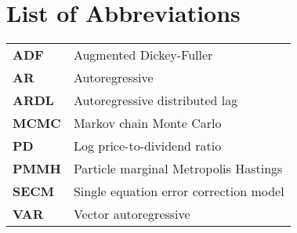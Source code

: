 \chapter{List of Abbreviations}
\begin{tabular}{ll}
\textbf{ADF} & Augmented Dickey-Fuller \\
\textbf{AR} & Autoregressive \\
\textbf{ARDL} & Autoregressive distributed lag \\
\textbf{MCMC} & Markov chain Monte Carlo \\
\textbf{PD} & Log price-to-dividend ratio \\
\textbf{PMMH} & Particle marginal Metropolis Hastings \\
\textbf{SECM} & Single equation error correction model \\
\textbf{VAR} & Vector autoregressive \\
\end{tabular}
